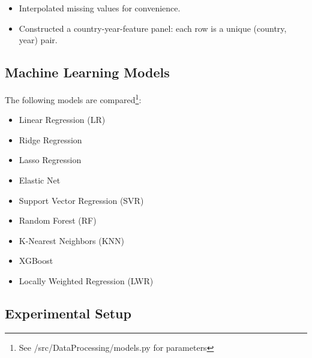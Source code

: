 \documentclass[12pt]{article}
\begin{document}
\begin{itemize}
    \item Interpolated missing values for convenience.
    \item Constructed a country-year-feature panel: each row is a unique (country, year) pair.
\end{itemize}



\subsection{Machine Learning Models}

The following models are compared\footnote{See /src/DataProcessing/models.py for parameters}:
\begin{itemize}
    \item Linear Regression (LR)
    \item Ridge Regression
    \item Lasso Regression
    \item Elastic Net
    \item Support Vector Regression (SVR)
    \item Random Forest (RF)
    \item K-Nearest Neighbors (KNN)
    \item XGBoost
    \item Locally Weighted Regression (LWR)
\end{itemize}

\subsection{Experimental Setup}
\end{document}
